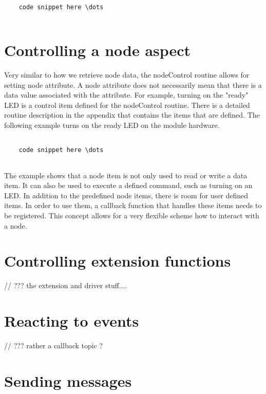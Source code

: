 \lstset{language=c++, style=codesnippetstyle}
\begin{lstlisting}
   
    code snippet here \dots
    
\end{lstlisting}

\section{Controlling a node aspect}

Very similar to how we retrieve node data, the nodeControl routine allows for setting node attribute. A node attribute does not necessarily mean that there is a data value associated with the attribute. For example, turning on the "ready" LED is a control item defined for the nodeControl routine. There is a detailed routine description in the appendix that contains the items that are defined. The following example turns on the ready LED on the module hardware.

\lstset{language=c++, style=codesnippetstyle}
\begin{lstlisting}
   
    code snippet here \dots
    
\end{lstlisting}

The example shows that a node item is not only used to read or write a data item. It can also be used to execute a defined command, such as turning on an LED. In addition to the predefined node items, there is room for user defined items. In order to use them, a callback function that handles these items needs to be registered. This concept allows for a very flexible scheme how to interact with a node.

\section{Controlling extension functions}

// ??? the extension and driver stuff....

\section{Reacting to events}


// ??? rather a callback topic ?


\section{Sending messages}


